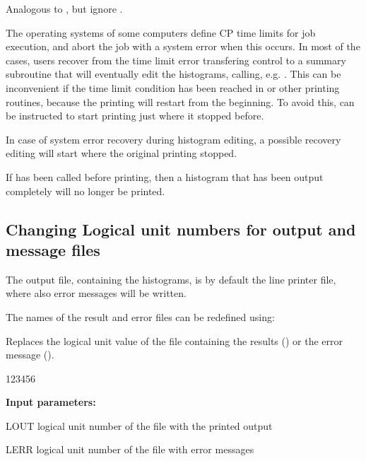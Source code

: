  
\Action
Analogous to
, but ignore .
 
 
The operating systems of some computers define CP time limits
for job execution,
and abort the job with a system error when this occurs.
In most of the cases, users recover from the time limit error transfering
control to a summary subroutine that will eventually edit the histograms,
calling, e.g. .
This can be inconvenient if the time limit condition
has been reached in  or other printing routines,
because the printing will restart from the beginning.
To avoid this,  can be instructed to
start printing just where it stopped before.
 
 
\Action
In case of system error recovery during histogram editing, a possible
recovery editing will start where the original printing stopped.
 
\Remark
 
If  has been called before printing, then a histogram
that has been output completely will no longer be printed.

\newpage%

\subsection{Changing Logical unit numbers for output and message files}
\label{HCUNILOG} 

The output file, containing the histograms, is by default the line
printer file, where also error messages will be written.
 
The names of the result and error files can be redefined using:
 
 
\Action
Replaces the logical unit value of the file
containing the results () or the
error message ().
 
\begin{DLtt}{123456}
\item[{\rm\bf Input parameters:}]
\item[LOUT] logical unit number of the file with the printed output
\item[LERR] logical unit number of the file with error messages
\end{DLtt}
 
